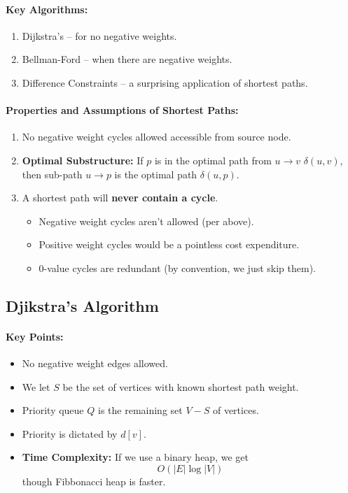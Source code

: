 \documentclass[a4paper,12pt]{report}
\begin{document}
\paragraph{Key Algorithms: } 
\begin{enumerate}
\item Dijkstra's -- for no negative weights.
\item Bellman-Ford -- when there are negative weights.
\item Difference Constraints -- a surprising application of shortest paths. 
\end{enumerate}


\paragraph{Properties and Assumptions of Shortest Paths: } 
\begin{enumerate}
\item No negative weight cycles allowed accessible from source node. 
\item \textbf{Optimal Substructure: } If $p$ is in the optimal path from $u\to v$ $\delta(u,v)$, then sub-path $u\to p$ is the optimal path $\delta(u,p)$.
\item A shortest path will \textbf{never contain a cycle}.
\begin{itemize}
\item Negative weight cycles aren't allowed (per above).
\item Positive weight cycles would be a pointless cost expenditure. 
\item 0-value cycles are redundant (by convention, we just skip them). 
\end{itemize}
\end{enumerate}

\subsection{Djikstra's Algorithm}

\paragraph{Key Points: } 
\begin{itemize}
\item No negative weight edges allowed.
\item We let $S$ be the set of vertices with known shortest path weight. 
\item Priority queue $Q$ is the remaining set $V-S$ of vertices. 
\item Priority is dictated by $d[v]$.
\item \textbf{Time Complexity: } If we use a binary heap, we get $$O(|E| \log |V|)$$ though Fibbonacci heap is faster. 
\end{itemize}
\end{document}

